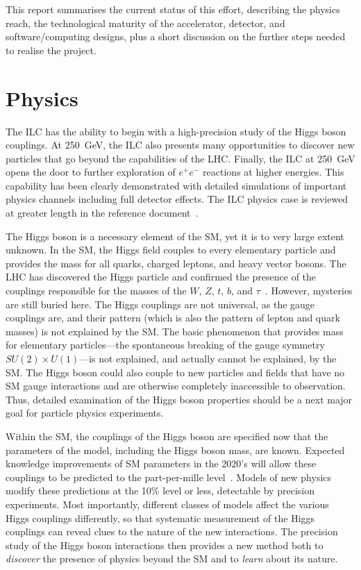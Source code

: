 \documentclass[%
reprint,
 floatfix,
 amsmath,amssymb,
 aps,
]{revtex4-1}
\def\ee{e^+e^-}
\begin{document}
This report summarises the current status of this effort, describing
the physics reach, the technological maturity of the accelerator,
detector, and software/computing designs,
plus a short discussion on the further steps 
 needed to realise the project.

\vspace{-.4cm}

\section{\label{sec:phys}Physics}

\vspace{-.3cm}

The ILC has the ability to begin with a high-precision study of the Higgs boson couplings.  At 250~GeV, the ILC also
presents many opportunities to discover new particles that go beyond
the capabilities of the LHC.  Finally, the ILC at 250~GeV opens the
door to further exploration of $\ee$ reactions at higher energies. This capability has been clearly demonstrated with detailed simulations of important physics channels including full detector effects. The ILC physics case is reviewed at greater length in the reference document~\cite{ILCforESS}.

The Higgs boson is a necessary element of the SM, yet it is to very large extent unknown.    In the SM, the Higgs field
couples to every elementary particle and provides the mass for all
quarks, charged leptons, and heavy vector bosons.   The LHC has discovered
the Higgs particle and confirmed the presence of the couplings responsible for the
masses of the $W$, $Z$, $t$, $b$, and $\tau$~\cite{LHCHiggssummary}. 
 However, mysteries are still
buried here.   The Higgs couplings are not universal, as the gauge
couplings are, and their pattern (which is also the pattern of lepton
and quark masses) is not explained by the SM.  The basic phenomenon that provides
mass for elementary particles---the spontaneous breaking of the gauge
symmetry $SU(2)\times U(1)$---is not explained, and actually cannot be
explained, by the SM.   The Higgs boson could also couple to new
particles and fields that have no SM gauge interactions and are
otherwise completely inaccessible to observation.  Thus, detailed
examination of the Higgs boson properties should be a next major
goal for particle physics experiments.

Within the SM, the couplings of the Higgs boson are specified now that
the parameters of the model, including the Higgs boson mass, are
known.  Expected knowledge improvements of SM parameters in the 2020's will allow these couplings to be predicted to the part-per-mille level~\cite{Lepage:2014fla}.
Models of new physics modify these predictions at the 10\% level or less, 
detectable by precision experiments.   Most importantly, different
classes of models affect the various Higgs couplings differently, so that
systematic measurement of the Higgs couplings can reveal clues to the
nature of the new interactions.   The precision study of the
Higgs boson interactions then provides a new method both to {\it discover}  the
presence of physics beyond the SM and to {\it learn}  about its nature.
\end{document}
